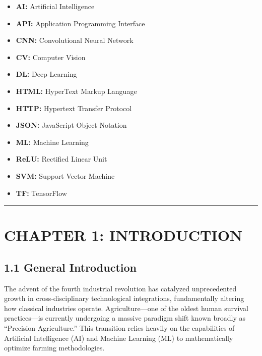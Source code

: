 \documentclass[
]{article}
\providecommand{\tightlist}{%
  \setlength{\itemsep}{0pt}\setlength{\parskip}{0pt}}
\begin{document}
\begin{itemize}
\tightlist
\item
  \textbf{AI:} Artificial Intelligence
\item
  \textbf{API:} Application Programming Interface
\item
  \textbf{CNN:} Convolutional Neural Network
\item
  \textbf{CV:} Computer Vision
\item
  \textbf{DL:} Deep Learning
\item
  \textbf{HTML:} HyperText Markup Language
\item
  \textbf{HTTP:} Hypertext Transfer Protocol
\item
  \textbf{JSON:} JavaScript Object Notation
\item
  \textbf{ML:} Machine Learning
\item
  \textbf{ReLU:} Rectified Linear Unit
\item
  \textbf{SVM:} Support Vector Machine
\item
  \textbf{TF:} TensorFlow
\end{itemize}

\begin{center}\rule{0.5\linewidth}{0.5pt}\end{center}

\section{CHAPTER 1: INTRODUCTION}\label{chapter-1-introduction}

\subsection{1.1 General Introduction}\label{general-introduction}

The advent of the fourth industrial revolution has catalyzed
unprecedented growth in cross-disciplinary technological integrations,
fundamentally altering how classical industries operate.
Agriculture---one of the oldest human survival practices---is currently
undergoing a massive paradigm shift known broadly as ``Precision
Agriculture.'' This transition relies heavily on the capabilities of
Artificial Intelligence (AI) and Machine Learning (ML) to mathematically
optimize farming methodologies.
\end{document}
